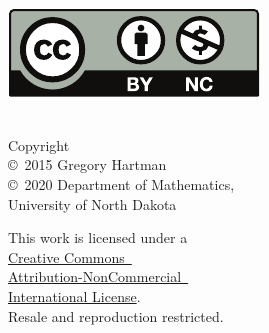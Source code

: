 \noindent\hspace{-1in}
\begin{minipage}[t]{.4\linewidth}\mbox{}\\
\href{http://creativecommons.org/licenses/by-nc/4.0/}{\includegraphics{figures/raw/by-nc}}
\end{minipage}\quad
\begin{minipage}[t]{.5\linewidth}\raggedright\mbox{}\\
\noindent Copyright\\
\copyright~2015 Gregory Hartman\\
\copyright~2020 Department of Mathematics,\\
University of North Dakota\medskip

This work is licensed under a\iflatexml\ \else\\\fi \href{http://creativecommons.org/licenses/by-nc/4.0/}{Creative Commons\iflatexml\ \else\\\fi
Attribution-NonCommercial\iflatexml\ \else\\ International License}.\\
Resale and reproduction restricted.
\end{minipage}

